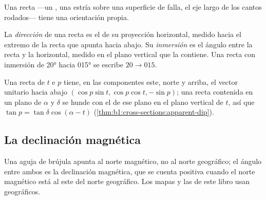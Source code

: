 Una recta ---un , una estría sobre una superficie de falla, el eje largo de los
cantos rodados--- tiene una orientación propia.

\begin{definition}\label{def:b1:field-lab-methods-1:trend-plunge}
La \emph{dirección} de una recta es el  de su proyección
horizontal, medido hacia el extremo de la recta que apunta hacia abajo. Su \emph{inmersión}
es el ángulo entre la recta y la horizontal, medido en el plano vertical que la contiene. Una recta
con inmersión de \ang{20} hacia \ang{015} se escribe $20\to015$.
\end{definition}

Una recta de  $t$ e  $p$ tiene, en las componentes este, norte y arriba, el vector unitario hacia abajo
$(\cos p\sin t, \cos p\cos t, -\sin p)$; una recta contenida en
un plano de  $\alpha$ y  $\delta$ se hunde con el 
de ese plano en el plano vertical de  $t$, así que $\tan p = \tan\delta\cos(\alpha - t)$
(\cref{thm:b1:cross-sections:apparent-dip}).

\subsection{La declinación magnética}

Una aguja de brújula apunta al norte magnético, no al norte geográfico; el ángulo entre ambos es la
declinación magnética, que se cuenta positiva cuando el norte magnético está al este del norte
geográfico. Los mapas y las  de este libro usan  geográficos.

